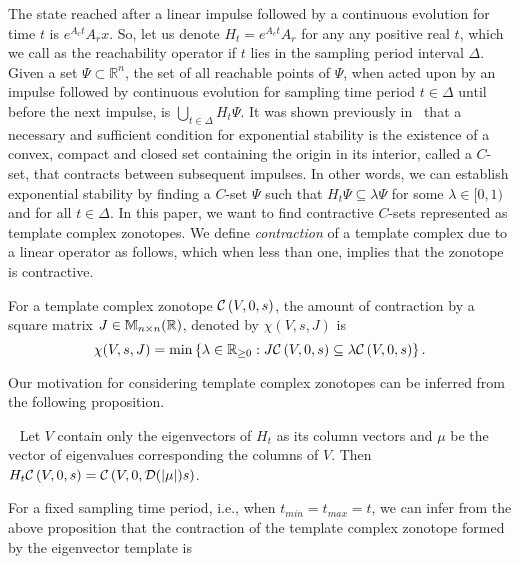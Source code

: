 
The state reached after a linear impulse followed by a continuous
evolution for time $t$ is $e^{A_ct}A_rx$.  So, let us denote
$H_t=e^{A_ct}A_r$ for any any positive real $t$, which we call as the
reachability operator if $t$ lies in the sampling period interval
$\Delta$.  Given a set $\Psi\subset\mathbb{R}^n$, the set of all
reachable points of $\Psi$, when acted upon by an impulse followed by
continuous evolution for sampling time period $t\in\Delta$ until
before the next impulse, is $\bigcup_{t\in\Delta}H_t\Psi$.  It was
shown previously in~\cite{2014-fiacchini-set,AlKhatib2015} that a
necessary and sufficient condition for exponential stability is the
existence of a convex, compact and closed set containing the origin in
its interior, called a $C$-set, that contracts between subsequent
impulses.  In other words, we can establish exponential stability by
finding a $C$-set $\Psi$ such that $H_t\Psi\subseteq\lambda\Psi$ for
some $\lambda\in[0,1)$ and for all $t\in\Delta$.  In this paper, we
  want to find contractive $C$-sets represented as template complex
  zonotopes.  We define \emph{contraction} of a
template complex due to a linear operator as follows, which when less
than one, implies that the zonotope is contractive.
%
\begin{defn}
For a template complex zonotope $\mathcal{C}\left(V,0,s\right)$, the amount of contraction by a
square matrix $J\in\mathbb{M}_{n\times n}(\mathbb{R})$, denoted by $\chi(V,s,J)$
is \[\chi(V,s,J)=\min\left\{\lambda\in\mathbb{R}_{\geq 0}:J\mathcal{C}\left(V,0,s\right)\subseteq
\lambda\mathcal{C}\left(V,0,s\right)\right\}.\]
\end{defn}
%
Our motivation for considering
template complex zonotopes can be
inferred from the following proposition.  
%
\begin{prop}~\label{prop:eig-cont}
  Let $V$ contain only the eigenvectors of $H_t$ as its column vectors
  and $\mu$ be the vector of eigenvalues corresponding the columns of
  $V$.  Then $H_t\mathcal{C}\left(V,0,s\right)=\mathcal{C}\left(V,0,\mathcal{D}(|\mu|)s\right)$.
\end{prop}
%
For a fixed sampling time period, i.e., when $t_{min}=t_{max}=t$, we
can infer from the above proposition that the contraction of the
template complex zonotope formed by the eigenvector template is
